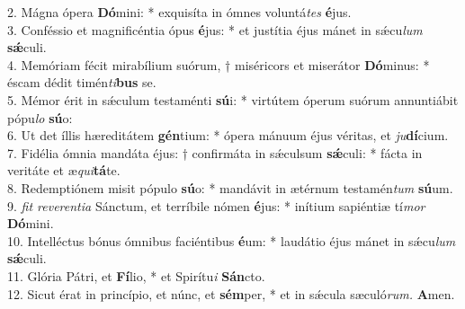 2. Mágna ópera \textbf{Dó}mini: * exquisíta in ómnes voluntá\textit{tes} \textbf{é}jus.\\
3. Conféssio et magnificéntia ópus \textbf{é}jus: * et justítia éjus mánet in sǽcu\textit{lum} \textbf{sǽ}culi.\\
4. Memóriam fécit mirabílium suórum, † miséricors et miserátor \textbf{Dó}minus: * éscam dédit timén\textit{ti}\textbf{bus} se.\\
5. Mémor érit in sǽculum testaménti \textbf{sú}i: * virtútem óperum suórum annuntiábit pópu\textit{lo} \textbf{sú}o:\\
6. Ut det íllis hæreditátem \textbf{gén}tium: * ópera mánuum éjus véritas, et \thinspace\textit{ju}\textbf{dí}cium.\\
7. Fidélia ómnia mandáta éjus: † confirmáta in sǽculsum \textbf{sǽ}culi: * fácta in veritáte et æ\textit{qui}\textbf{tá}te.\\
8. Redemptiónem misit pópulo \textbf{sú}o: * mandávit in ætérnum testamén\textit{tum} \textbf{sú}um.\\
9. \textit{fit reverentia} Sánctum, et terríbile nómen \textbf{é}jus: * inítium sapiéntiæ tí\textit{mor} \textbf{Dó}mini.\\
10. Intelléctus bónus ómnibus faciéntibus \textbf{é}um: * laudátio éjus mánet in sǽcu\textit{lum} \textbf{sǽ}culi.\\
11. Glória Pátri, et \textbf{Fí}lio, * et Spirítu\textit{i} \textbf{Sán}cto.\\
12. Sicut érat in princípio, et núnc, et \textbf{sém}per, * et in sǽcula sæculó\textit{rum.} \textbf{A}men.